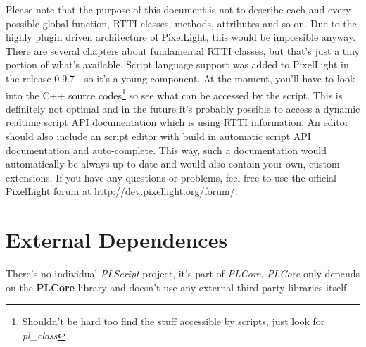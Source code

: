 Please note that the purpose of this document is not to describe each and every possible global function, RTTI classes, methods, attributes and so on. Due to the highly plugin driven architecture of PixelLight, this would be impossible anyway. There are several chapters about fundamental RTTI classes, but that's just a tiny portion of what's available. Script language support was added to PixelLight in the release 0.9.7 - so it's a young component. At the moment, you'll have to look into the C++ source codes\footnote{Shouldn't be hard too find the stuff accessible by scripts, just look for \emph{pl\_class}} so see what can be accessed by the script. This is definitely not optimal and in the future it's probably possible to access a dynamic realtime script API documentation which is using RTTI information. An editor should also include an script editor with build in automatic script API documentation and auto-complete. This way, such a documentation would automatically be always up-to-date and would also contain your own, custom extensions. If you have any questions or problems, feel free to use the official PixelLight forum at \url{http://dev.pixellight.org/forum/}.




\section{External Dependences}
There's no individual \emph{PLScript} project, it's part of \emph{PLCore}. \emph{PLCore} only depends on the \textbf{PLCore} library and doesn't use any external third party libraries itself.
